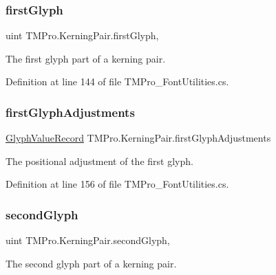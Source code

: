 \subsubsection{\texorpdfstring{firstGlyph}{firstGlyph}}
{\footnotesize\ttfamily uint T\+M\+Pro.\+Kerning\+Pair.\+first\+Glyph\hspace{0.3cm}{\ttfamily [get]}, {\ttfamily [set]}}



The first glyph part of a kerning pair. 



Definition at line 144 of file T\+M\+Pro\+\_\+\+Font\+Utilities.\+cs.

\mbox{\label{class_t_m_pro_1_1_kerning_pair_a5eed997a7f25917e7de7804a6cf052f4}} 
\subsubsection{\texorpdfstring{firstGlyphAdjustments}{firstGlyphAdjustments}}
{\footnotesize\ttfamily \mbox{\hyperlink{struct_t_m_pro_1_1_glyph_value_record}{Glyph\+Value\+Record}} T\+M\+Pro.\+Kerning\+Pair.\+first\+Glyph\+Adjustments\hspace{0.3cm}{\ttfamily [get]}}



The positional adjustment of the first glyph. 



Definition at line 156 of file T\+M\+Pro\+\_\+\+Font\+Utilities.\+cs.

\mbox{\label{class_t_m_pro_1_1_kerning_pair_a65feda26da1fd1a3fcdb1aa4ca681612}} 
\subsubsection{\texorpdfstring{secondGlyph}{secondGlyph}}
{\footnotesize\ttfamily uint T\+M\+Pro.\+Kerning\+Pair.\+second\+Glyph\hspace{0.3cm}{\ttfamily [get]}, {\ttfamily [set]}}



The second glyph part of a kerning pair. 



